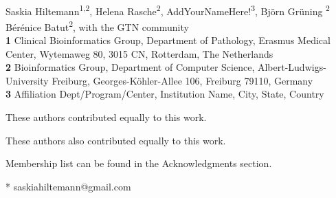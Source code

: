 \documentclass[10pt,letterpaper]{article}
\begin{document}
\vspace*{0.2in}

\begin{flushleft}
{\Large
\textbf{} %
}
\newline
\\
Saskia Hiltemann\textsuperscript{1,2\Yinyang\textpilcrow},
Helena Rasche\textsuperscript{2\Yinyang},
AddYourNameHere!\textsuperscript{3},
Björn Grüning \textsuperscript{2\ddag}
Bérénice Batut\textsuperscript{2\ddag},
with the GTN community
\\
\bigskip
\textbf{1} Clinical Bioinformatics Group, Department of Pathology, Erasmus Medical Center, Wytemaweg 80, 3015 CN, Rotterdam, The Netherlands \\
\textbf{2} Bioinformatics Group, Department of Computer Science, Albert-Ludwigs-University Freiburg, Georges-Köhler-Allee 106, Freiburg 79110, Germany \\
\textbf{3} Affiliation Dept/Program/Center, Institution Name, City, State, Country \\
\bigskip

%
%
\Yinyang These authors contributed equally to this work.

\ddag These authors also contributed equally to this work.



\textpilcrow Membership list can be found in the Acknowledgments section.

* saskiahiltemann@gmail.com

\end{flushleft}
\end{document}
